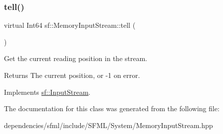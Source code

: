 \subsubsection{\texorpdfstring{tell()}{tell()}}
{\footnotesize\ttfamily virtual Int64 sf\+::\+Memory\+Input\+Stream\+::tell (\begin{DoxyParamCaption}{ }\end{DoxyParamCaption})\hspace{0.3cm}{\ttfamily [virtual]}}



Get the current reading position in the stream. 

\begin{DoxyReturn}{Returns}
The current position, or -\/1 on error. 
\end{DoxyReturn}


Implements \hyperlink{classsf_1_1_input_stream_a599515b9ccdbddb6fef5a98424fd559c}{sf\+::\+Input\+Stream}.



The documentation for this class was generated from the following file\+:\begin{DoxyCompactItemize}
\item 
dependencies/sfml/include/\+S\+F\+M\+L/\+System/Memory\+Input\+Stream.\+hpp\end{DoxyCompactItemize}
